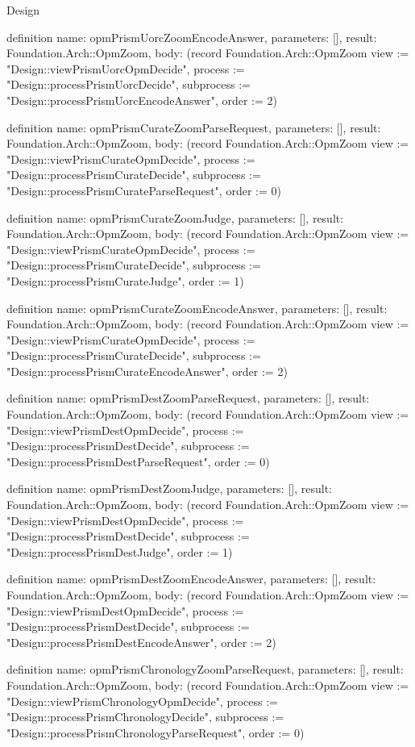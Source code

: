 \begin{lexlean}{Design}
\begin{semanticmodule}
definition{
  name: opmPrismUorcZoomEncodeAnswer,
  parameters: [],
  result: Foundation.Arch::OpmZoom,
  body: (record Foundation.Arch::OpmZoom {view := "Design::viewPrismUorcOpmDecide", process := "Design::processPrismUorcDecide", subprocess := "Design::processPrismUorcEncodeAnswer", order := 2})
}

definition{
  name: opmPrismCurateZoomParseRequest,
  parameters: [],
  result: Foundation.Arch::OpmZoom,
  body: (record Foundation.Arch::OpmZoom {view := "Design::viewPrismCurateOpmDecide", process := "Design::processPrismCurateDecide", subprocess := "Design::processPrismCurateParseRequest", order := 0})
}

definition{
  name: opmPrismCurateZoomJudge,
  parameters: [],
  result: Foundation.Arch::OpmZoom,
  body: (record Foundation.Arch::OpmZoom {view := "Design::viewPrismCurateOpmDecide", process := "Design::processPrismCurateDecide", subprocess := "Design::processPrismCurateJudge", order := 1})
}

definition{
  name: opmPrismCurateZoomEncodeAnswer,
  parameters: [],
  result: Foundation.Arch::OpmZoom,
  body: (record Foundation.Arch::OpmZoom {view := "Design::viewPrismCurateOpmDecide", process := "Design::processPrismCurateDecide", subprocess := "Design::processPrismCurateEncodeAnswer", order := 2})
}

definition{
  name: opmPrismDestZoomParseRequest,
  parameters: [],
  result: Foundation.Arch::OpmZoom,
  body: (record Foundation.Arch::OpmZoom {view := "Design::viewPrismDestOpmDecide", process := "Design::processPrismDestDecide", subprocess := "Design::processPrismDestParseRequest", order := 0})
}

definition{
  name: opmPrismDestZoomJudge,
  parameters: [],
  result: Foundation.Arch::OpmZoom,
  body: (record Foundation.Arch::OpmZoom {view := "Design::viewPrismDestOpmDecide", process := "Design::processPrismDestDecide", subprocess := "Design::processPrismDestJudge", order := 1})
}

definition{
  name: opmPrismDestZoomEncodeAnswer,
  parameters: [],
  result: Foundation.Arch::OpmZoom,
  body: (record Foundation.Arch::OpmZoom {view := "Design::viewPrismDestOpmDecide", process := "Design::processPrismDestDecide", subprocess := "Design::processPrismDestEncodeAnswer", order := 2})
}

definition{
  name: opmPrismChronologyZoomParseRequest,
  parameters: [],
  result: Foundation.Arch::OpmZoom,
  body: (record Foundation.Arch::OpmZoom {view := "Design::viewPrismChronologyOpmDecide", process := "Design::processPrismChronologyDecide", subprocess := "Design::processPrismChronologyParseRequest", order := 0})
}


\end{semanticmodule}
\end{lexlean}
